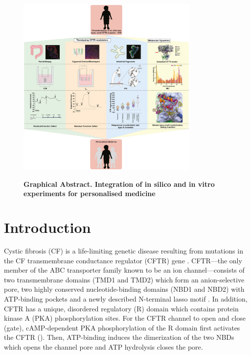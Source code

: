 \begin{figure} [h]
	\begin{center}
		\includegraphics[width=0.80\textwidth]{figures/I37R/graphical_abstract.jpg}
	\end{center}
	\captionsetup{singlelinecheck = false, justification=raggedright}
	\caption[Graphical Abstract. Integration of in silico and in vitro experiments for personalised medicine] {\textbf{Graphical Abstract. Integration of in silico and in vitro experiments for personalised medicine}}{}
	\label{I37R_graphical_abstract}
\end{figure}

\section{Introduction}
Cystic fibrosis (CF) is a life-limiting genetic disease resulting from mutations in the CF transmembrane conductance regulator (CFTR) gene \cite{ratjen2015}. CFTR—the only member of the ABC transporter family known to be an ion channel—consists of two transmembrane domains (TMD1 and TMD2) which form an anion-selective pore, two highly conserved nucleotide-binding domains (NBD1 and NBD2) with ATP-binding pockets and a newly described N-terminal lasso motif \cite{hwang2013, zhang2016}. In addition, CFTR has a unique, disordered regulatory (R) domain which contains protein kinase A (PKA) phosphorylation sites. For the CFTR channel to open and close (gate), cAMP-dependent PKA phosphorylation of the R domain first activates the CFTR (\cite{gadsby1994}). Then, ATP-binding induces the dimerization of the two NBDs which opens the channel pore and ATP hydrolysis closes the pore.

